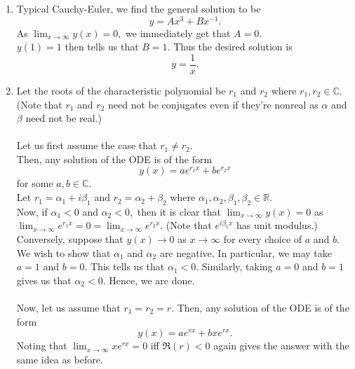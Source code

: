 \documentclass{article}
\begin{document}
\begin{enumerate}[label = Q.\arabic*.]
\begin{enumerate}[start = 3, label = (\roman*)]
	\end{enumerate}
	\item Typical Cauchy-Euler, we find the general solution to be 
	\begin{equation*} 
		y = Ax^3 + Bx^{-1}.
	\end{equation*}
	As $\displaystyle\lim_{x\to \infty}y(x) = 0,$ we immediately get that $A = 0.$\\
	$y(1) = 1$ then tells us that $B = 1.$ Thus the desired solution is
	\begin{equation*} 
		y = \dfrac{1}{x}.
	\end{equation*}
	\item Let the roots of the characteristic polynomial be $r_1$ and $r_2$ where $r_1, r_2 \in \mathbb{C}.$\\
	(Note that $r_1$ and $r_2$ need not be conjugates even if they're nonreal as $\alpha$ and $\beta$ need not be real.)\\\\
	Let us first assume the case that $r_1 \neq r_2.$\\
	Then, any solution of the ODE is of the form
	\begin{equation*} 
		y(x) = ae^{r_1 x} + be^{r_2 x}
	\end{equation*}
	for some $a, b \in \mathbb{C}.$\\
	Let $r_1 = \alpha_1 + i\beta_1$ and $r_2 = \alpha_2 + \beta_2$ where $\alpha_1, \alpha_2, \beta_1, \beta_2 \in \mathbb{R}.$\\
	Now, if $\alpha_1 < 0$ and $\alpha_2 < 0,$ then it is clear that $\displaystyle\lim_{x\to \infty}y(x) = 0$ as $\displaystyle\lim_{x\to \infty}e^{r_1x} = 0 = \displaystyle\lim_{x\to \infty}e^{r_2x}.$ (Note that $e^{i\beta_1x}$ has unit modulus.)\\
	Conversely, suppose that $y(x) \to 0$ as $x \to \infty$ for every choice of $a$ and $b.$ We wish to show that $\alpha_1$ and $\alpha_2$ are negative. In particular, we may take $a = 1$ and $b = 0.$ This tells us that $\alpha_1 < 0.$ Similarly, taking $a = 0$ and $b = 1$ gives us that $\alpha_2 < 0.$ Hence, we are done.\\\\
	Now, let us assume that $r_1 = r_2 = r.$ Then, any solution of the ODE is of the form
	\begin{equation*} 
		y(x) = ae^{rx} + bxe^{rx}.
	\end{equation*}
	Noting that $\displaystyle\lim_{x\to \infty}xe^{rx} = 0$ iff $\Re(r) < 0$ again gives the answer with the same idea as before.
\end{enumerate}
\end{document}
